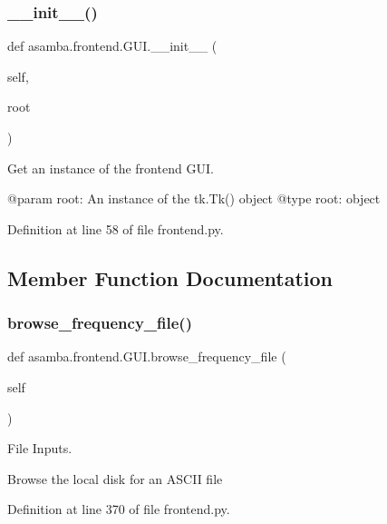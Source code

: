 \subsubsection{\texorpdfstring{\+\_\+\+\_\+init\+\_\+\+\_\+()}{\_\_init\_\_()}}
{\footnotesize\ttfamily def asamba.\+frontend.\+G\+U\+I.\+\_\+\+\_\+init\+\_\+\+\_\+ (\begin{DoxyParamCaption}\item[{}]{self,  }\item[{}]{root }\end{DoxyParamCaption})}

\begin{DoxyVerb}Get an instance of the frontend GUI.

@param root: An instance of the tk.Tk() object
@type root: object
\end{DoxyVerb}
 

Definition at line 58 of file frontend.\+py.



\subsection{Member Function Documentation}
\mbox{\label{classasamba_1_1frontend_1_1_g_u_i_aece59ad9eaff01043c324f9fa2175c98}} 
\subsubsection{\texorpdfstring{browse\+\_\+frequency\+\_\+file()}{browse\_frequency\_file()}}
{\footnotesize\ttfamily def asamba.\+frontend.\+G\+U\+I.\+browse\+\_\+frequency\+\_\+file (\begin{DoxyParamCaption}\item[{}]{self }\end{DoxyParamCaption})}



File Inputs. 

\begin{DoxyVerb}Browse the local disk for an ASCII file \end{DoxyVerb}
 

Definition at line 370 of file frontend.\+py.

